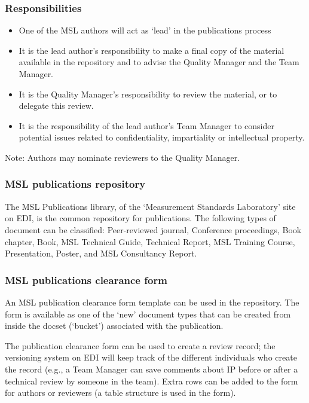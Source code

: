 \subsubsection{Responsibilities}
\begin{itemize}
\item  One of the MSL authors will act as ‘lead’ in the publications process
\item  It is the lead author’s responsibility to make a final copy of the material available in the repository and to advise the Quality Manager and the Team Manager.
\item  It is the Quality Manager’s responsibility to review the material, or to delegate this review.
\item  It is the responsibility of the lead author’s Team Manager to consider potential issues related to confidentiality, impartiality or intellectual property.
\end{itemize}

Note: Authors may nominate reviewers to the Quality Manager.

\subsubsection{MSL publications repository}
 \label{sss:publications_repository}
The MSL Publications library, of the ‘Measurement Standards Laboratory’ site on EDI, is the common repository for publications.  The following types of document can be classified: Peer-reviewed journal, Conference proceedings, Book chapter, Book, MSL Technical Guide, Technical Report, MSL Training Course, Presentation, Poster, and MSL Consultancy Report. 

\subsubsection{MSL publications clearance form}
An MSL publication clearance form template can be used in the repository. The form is available as one of the ‘new’ document types that can be created from inside the docset (‘bucket’) associated with the publication.

The publication clearance form can be used to create a review record; the versioning system on EDI will keep track of the different individuals who create the record (e.g., a Team Manager can save comments about IP before or after a technical review by someone in the team). Extra rows can be added to the form for authors or reviewers (a table structure is used in the form).

